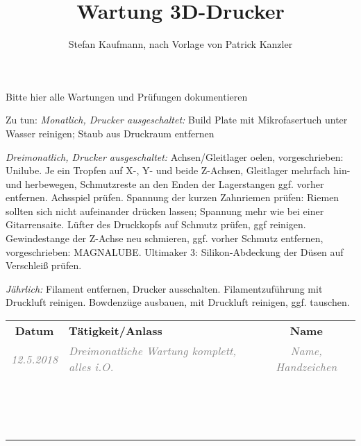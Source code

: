 \documentclass{\basedir/vsh-document}
\title{Wartung 3D-Drucker}
\author{Stefan Kaufmann, nach Vorlage von Patrick Kanzler}
\newcommand{\thickhline}{\noalign{\hrule height 2pt}}
\begin{document}
Bitte hier alle Wartungen und Prüfungen dokumentieren

Zu tun: \emph{Monatlich, Drucker ausgeschaltet:} Build Plate mit Mikrofasertuch unter Wasser reinigen; Staub aus Druckraum entfernen

\emph{Dreimonatlich, Drucker ausgeschaltet:} Achsen/Gleitlager oelen, vorgeschrieben: Unilube. Je ein Tropfen auf X-, Y- und beide Z-Achsen, Gleitlager mehrfach hin- und herbewegen, Schmutzreste an den Enden der Lagerstangen ggf. vorher entfernen. Achsspiel prüfen. Spannung der kurzen Zahnriemen prüfen: Riemen sollten sich nicht aufeinander drücken lassen; Spannung mehr wie bei einer Gitarrensaite. Lüfter des Druckkopfs auf Schmutz prüfen, ggf reinigen. Gewindestange der Z-Achse neu schmieren, ggf. vorher Schmutz entfernen, vorgeschrieben: MAGNALUBE. Ultimaker 3: Silikon-Abdeckung der Düsen auf Verschleiß prüfen.

\emph{Jährlich:} Filament entfernen, Drucker ausschalten. Filamentzuführung mit Druckluft reinigen. Bowdenzüge ausbauen, mit Druckluft reinigen, ggf. tauschen.

\newcommand{\bsp}[1]{\textcolor{gray}{\itshape #1}}
\newcommand{\beispielzeile}[5]{\bsp{#2} & \bsp{#3} & \bsp{#4} \\ \hline}
\newcommand{\leerzeile}{\vbox{\vspace{2.4em}} & & \\ \hline}
\vspace{-.4em}
\begin{tabularx}{\textwidth}{|c|X|c|} \hline
\bfseries Datum      &  \bfseries Tätigkeit/Anlass  & \bfseries Name \\\thickhline
\beispielzeile{BSP}{12.5.2018}{ Dreimonatliche Wartung komplett, alles i.O. }{Name, Handzeichen}
\leerzeile
\leerzeile
\leerzeile
\leerzeile
\leerzeile
\leerzeile
\leerzeile
\leerzeile
\leerzeile
\leerzeile
\leerzeile
\leerzeile
\leerzeile
\leerzeile
\leerzeile
\leerzeile
\end{tabularx}
\end{document}
